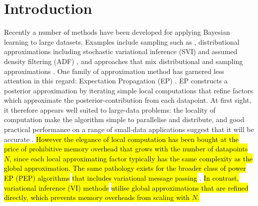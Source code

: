 \section{Introduction}


Recently a number of methods have been developed for applying Bayesian learning to large datasets. Examples include sampling such as \cite{ahn:distributedMCMC, bardenet:MCMC}, distributional approximations including stochastic variational inference (SVI) \cite{hoffman:svi} and assumed density filtering (ADF) \cite{miguel:pbp}, and approaches that mix distributional and sampling approximations \cite{gelman:dep,xu:sms}. 
%
One family of approximation method has garnered less attention in this regard: Expectation Propagation (EP) \cite{minka:ep, opper:ec}. EP constructs a posterior approximation by iterating simple local computations that refine factors which approximate the posterior-contribution from each datapoint. At first sight, it therefore appears well suited to large-data problems: the locality of computation make the algorithm simple to parallelise and distribute, and good practical performance on a range of small-data applications suggest that it will be accurate \cite{kuss:gpep,barthelme:ep_likelihood,cunningham:gaussianEP}. 
%
\hl{However the elegance of local computation has been bought at the price of prohibitive memory overhead that grows with the number of datapoints $N$, since each local approximating factor typically has the same complexity as the global approximation. The same pathology exists for the broader class of power EP (PEP) algorithms } \cite{minka:powerep} \hl{that includes variational message passing} \cite{winn:vmp}. \hl{In contrast, variational inference (VI) methods} \cite{jordan:variational,beal:variational} \hl{utilise global approximations that are refined directly, which prevents memory overheads from scaling with $N$. }



